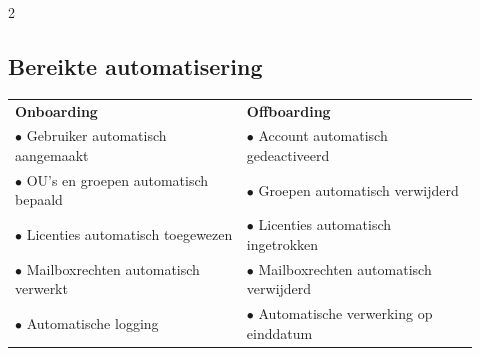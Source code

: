 \documentclass[a0,portrait]{hogent-poster}
\begin{document}
\begin{multicols}{2}
\begin{center}

\end{center}

\vspace{8pt}

\subsection{Bereikte automatisering}

\begin{tabular}{p{0.46\linewidth} p{0.46\linewidth}}
\textbf{Onboarding} &
\textbf{Offboarding} \\[4pt]

$\bullet$ Gebruiker automatisch aangemaakt &
$\bullet$ Account automatisch gedeactiveerd \\

$\bullet$ OU's en groepen automatisch bepaald &
$\bullet$ Groepen automatisch verwijderd \\

$\bullet$ Licenties automatisch toegewezen &
$\bullet$ Licenties automatisch ingetrokken \\

$\bullet$ Mailboxrechten automatisch verwerkt &
$\bullet$ Mailboxrechten automatisch verwijderd \\

$\bullet$ Automatische logging &
$\bullet$ Automatische verwerking op einddatum
\end{tabular}


\end{multicols}
\end{document}
